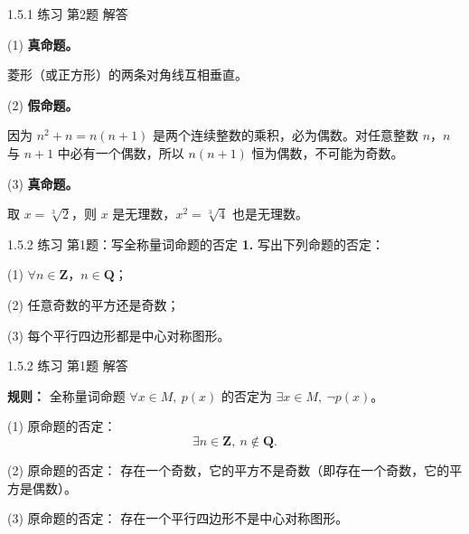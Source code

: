 \documentclass[10pt,aspectratio=169,serif]{beamer}
\begin{document}
\begin{frame}[t]{1.5.1 练习 第2题 解答}
\begin{tcolorbox}[colback=orange!10,colframe=orange,title=\textbf{解}]
(1) \textbf{真命题。}

\vspace{0.3em}
菱形（或正方形）的两条对角线互相垂直。

\vspace{0.8em}
(2) \textbf{假命题。}

\vspace{0.3em}
因为 $n^2 + n = n(n+1)$ 是两个连续整数的乘积，必为偶数。对任意整数 $n$，$n$ 与 $n+1$ 中必有一个偶数，所以 $n(n+1)$ 恒为偶数，不可能为奇数。

\vspace{0.8em}
(3) \textbf{真命题。}

\vspace{0.3em}
取 $x = \sqrt[3]{2}$，则 $x$ 是无理数，$x^2 = \sqrt[3]{4}$ 也是无理数。
\end{tcolorbox}
\end{frame}

\begin{frame}[t]{1.5.2 练习 第1题：写全称量词命题的否定}
\textbf{1.} 写出下列命题的否定：

\vspace{0.5em}
(1) $\forall n \in \mathbf{Z}$，$n \in \mathbf{Q}$；

\vspace{0.3em}
(2) 任意奇数的平方还是奇数；

\vspace{0.3em}
(3) 每个平行四边形都是中心对称图形。
\end{frame}

\begin{frame}[t]{1.5.2 练习 第1题 解答}
\begin{tcolorbox}[colback=orange!10,colframe=orange,title=\textbf{解}]
\textbf{规则：} 全称量词命题 $\forall x \in M,\ p(x)$ 的否定为 $\exists x \in M,\ \neg p(x)$。

\vspace{0.8em}
(1) 原命题的否定：
\[
\exists n \in \mathbf{Z},\ n \notin \mathbf{Q}.
\]

\vspace{0.5em}
(2) 原命题的否定：
存在一个奇数，它的平方不是奇数（即存在一个奇数，它的平方是偶数）。

\vspace{0.5em}
(3) 原命题的否定：
存在一个平行四边形不是中心对称图形。
\end{tcolorbox}
\end{frame}
\end{document}
